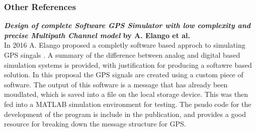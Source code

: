 
\subsubsection{Other References}

\textbf{\emph{Design of complete Software GPS Simulator with low complexity and precise Multipath Channel model} by A. Elango et al.} \\ 
In 2016 A. Elango proposed a completly software based approch to simulating GPS singals \cite{RN15}. A summary of the difference between analog
and digital based simulation systems is provided, with justification for producing a softawre based solution. In this proposal the GPS signals are created
using a custom piece of software. The output of this software is a message that has already been moudlated, which is saved into a file on the local
storage device. This was then fed into a MATLAB simulation environment for testing. The psudo code for the development of the program is include in
the publication, and provides a good resource for breaking down the message structure for GPS.

\medskip



